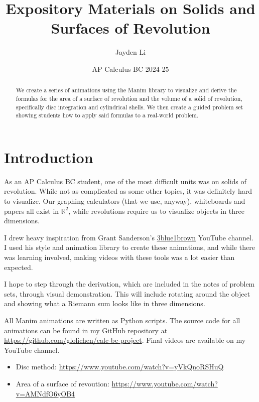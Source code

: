 \documentclass{article}
\title{\vspace*{-40pt} Expository Materials on Solids and Surfaces of Revolution}
\author{Jayden Li}
\date{AP Calculus BC 2024-25}
\begin{document}
\fontsize{11pt}{12pt}\selectfont
\setlength{\abovedisplayskip}{\abovedisplayskip/2}
\setlength{\belowdisplayskip}{\belowdisplayskip/2}
\setlength{\parindent}{0pt}
\setlength{\parskip}{2ex plus 0.5ex minus 0.2ex}
\maketitle

\begin{abstract}
	We create a series of animations using the Manim library to visualize and derive the formulas for the area of a surface of revolution and the volume of a solid of revolution, specifically disc integration and cylindrical shells. We then create a guided problem set showing students how to apply said formulas to a real-world problem.
\end{abstract}

\section{Introduction}

As an AP Calculus BC student, one of the most difficult units was on solids of revolution. While not as complicated as some other topics, it was definitely hard to visualize. Our graphing calculators (that we use, anyway), whiteboards and papers all exist in $\mathbb R^2$, while revolutions require us to visualize objects in three dimensions.

I drew heavy inspiration from Grant Sanderson's \href{https://www.youtube.com/c/3blue1brown}{3blue1brown} YouTube channel. I used his style and animation library to create these animations, and while there was learning involved, making videos with these tools was a lot easier than expected.

I hope to step through the derivation, which are included in the notes of problem sets, through visual demonstration. This will include rotating around the object and showing what a Riemann sum looks like in three dimensions.

All Manim animations are written as Python scripts. The source code for all animations can be found in my GitHub repository at \url{https://github.com/glolichen/calc-bc-project}. Final videos are available on my YouTube channel.
\begin{itemize}[topsep=0pt]
	\item Disc method: \url{https://www.youtube.com/watch?v=yVkQnoRSHuQ}
	\item Area of a surface of revoution: \url{https://www.youtube.com/watch?v=AMNdfO6yOB4}
\end{itemize}
\end{document}
